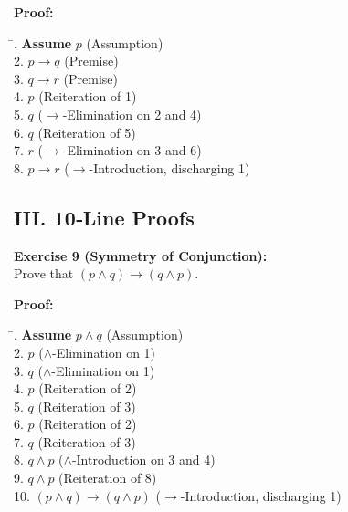 \documentclass[12pt]{article}
\begin{document}
\textbf{Proof:}
\begin{tabbing}
\hspace*{2cm}\= . \quad \textbf{Assume } \(p\) \quad \quad (Assumption)\\[0.5em]
2. \quad \(p\to q\) \quad \quad \quad (Premise)\\[0.5em]
3. \quad \(q\to r\) \quad \quad \quad (Premise)\\[0.5em]
4. \quad \(p\) \quad \quad \quad (Reiteration of 1)\\[0.5em]
5. \quad \(q\) \quad \quad \quad (\(\to\)-Elimination on 2 and 4)\\[0.5em]
6. \quad \(q\) \quad \quad \quad (Reiteration of 5)\\[0.5em]
7. \quad \(r\) \quad \quad \quad (\(\to\)-Elimination on 3 and 6)\\[0.5em]
8. \quad \(p\to r\) \quad \quad (\(\to\)-Introduction, discharging 1)
\end{tabbing}

\subsection{III. 10‐Line Proofs}

\bigskip
\textbf{Exercise 9 (Symmetry of Conjunction):}\\[0.3em]
Prove that \((p\land q)\to (q\land p)\).

\textbf{Proof:}
\begin{tabbing}
\hspace*{2cm}\= . \quad \textbf{Assume } \(p\land q\) \quad \quad (Assumption)\\[0.5em]
2. \quad \(p\) \quad \quad \quad (\(\land\)-Elimination on 1)\\[0.5em]
3. \quad \(q\) \quad \quad \quad (\(\land\)-Elimination on 1)\\[0.5em]
4. \quad \(p\) \quad \quad \quad (Reiteration of 2)\\[0.5em]
5. \quad \(q\) \quad \quad \quad (Reiteration of 3)\\[0.5em]
6. \quad \(p\) \quad \quad \quad (Reiteration of 2)\\[0.5em]
7. \quad \(q\) \quad \quad \quad (Reiteration of 3)\\[0.5em]
8. \quad \(q\land p\) \quad \quad (\(\land\)-Introduction on 3 and 4)\\[0.5em]
9. \quad \(q\land p\) \quad \quad (Reiteration of 8)\\[0.5em]
10. \quad \((p\land q)\to (q\land p)\) \quad (\(\to\)-Introduction, discharging 1)
\end{tabbing}
\end{document}
